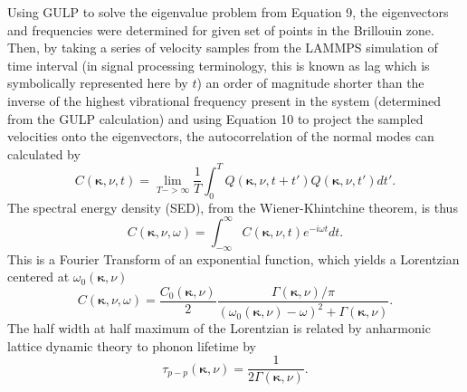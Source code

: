 \documentclass{article}
\begin{document}
Using GULP to solve the eigenvalue problem from Equation 9, the eigenvectors and frequencies were determined for given set of points in the Brillouin zone. Then, by taking a series of velocity samples from the LAMMPS simulation of time interval (in signal processing terminology, this is known as lag which is symbolically represented here by $t$) an order of magnitude shorter than the inverse of the highest vibrational frequency present in the system (determined from the GULP calculation) and using Equation 10 to project the sampled velocities onto the eigenvectors, the autocorrelation of the normal modes can calculated by
\begin{equation}
C(\pmb{\kappa},\nu,t)=\lim_{T->\infty}\frac{1}{T}\int_{0}^{T}Q(\pmb{\kappa},\nu,t+t')Q(\pmb{\kappa},\nu,t')dt'.
\end{equation}
The spectral energy density (SED), from the Wiener-Khintchine theorem, is thus
\begin{equation}
C(\pmb{\kappa},\nu,\omega)=\int_{-\infty}^{\infty}C(\pmb{\kappa},\nu,t)e^{-i\omega t}dt.
\end{equation}
This is a Fourier Transform of an exponential function, which yields a Lorentzian centered at $\omega_0(\pmb{\kappa},\nu)$
\begin{equation}
C(\pmb{\kappa},\nu,\omega)=\frac{C_0(\pmb{\kappa},\nu)}{2}\frac{\Gamma(\pmb{\kappa},\nu)/\pi}{(\omega_0(\pmb{\kappa},\nu)-\omega)^2+\Gamma(\pmb{\kappa},\nu)}.
\end{equation}
The half width at half maximum of the Lorentzian is related by anharmonic lattice dynamic theory to phonon lifetime by
\begin{equation}
\tau_{p-p}(\pmb{\kappa}, \nu)=\frac{1}{2\Gamma(\pmb{\kappa},\nu)}.
\end{equation}
\end{document}
